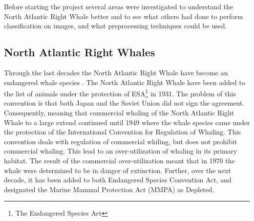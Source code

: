 Before starting the project several areas were investigated to understand the North Atlantic Right Whale better and to see what others had done to perform classification on images, and what preprocessing techniques could be used.

\subsection{North Atlantic Right Whales}
Through the last decades the North Atlantic Right Whale have become an endangered whale species \cite{NOAA}. The North Atlantic Right Whale have been added to the list of animals under the protection of ESA\footnote{The Endangered Species Act} in 1931. The problem of this convention is that both Japan and the Soviet Union did not sign the agreement. Consequently, meaning that commercial whaling of the North Atlantic Right Whale to a large extend continued until 1949 where the whale species came under the protection of the International Convention for Regulation of Whaling. 
This convention deals with regulation of commercial whiling, but does not prohibit commercial whaling. 
This lead to an over-utilization of whaling in its primary habitat. The result of the commercial over-utilization meant that in 1970 the whale were determined to be in danger of extinction. 
Further, over the next decade, it has been added to both Endangered Species Convention Act, and designated the Marine Mammal Protection Act (MMPA) as Depleted.

